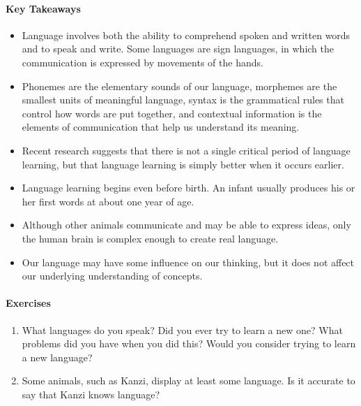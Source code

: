 \documentclass[
]{krantz}
\providecommand{\tightlist}{%
  \setlength{\itemsep}{0pt}\setlength{\parskip}{0pt}}
\begin{document}
\paragraph*{Key Takeaways}\label{key-takeaways-7}

\begin{itemize}
\tightlist
\item
  Language involves both the ability to comprehend spoken and written words and to speak and write. Some languages are sign languages, in which the communication is expressed by movements of the hands.
\item
  Phonemes are the elementary sounds of our language, morphemes are the smallest units of meaningful language, syntax is the grammatical rules that control how words are put together, and contextual information is the elements of communication that help us understand its meaning.
\item
  Recent research suggests that there is not a single critical period of language learning, but that language learning is simply better when it occurs earlier.
\item
  Language learning begins even before birth. An infant usually produces his or her first words at about one year of age.
\item
  Although other animals communicate and may be able to express ideas, only the human brain is complex enough to create real language.
\item
  Our language may have some influence on our thinking, but it does not affect our underlying understanding of concepts.
\end{itemize}

\paragraph*{Exercises}\label{exercises-7}

\begin{enumerate}
\def\labelenumi{\arabic{enumi}.}
\tightlist
\item
  What languages do you speak? Did you ever try to learn a new one? What problems did you have when you did this? Would you consider trying to learn a new language?
\item
  Some animals, such as Kanzi, display at least some language. Is it accurate to say that Kanzi knows language?
\end{enumerate}
\end{document}
